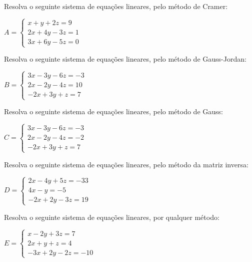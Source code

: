 \documentclass[pdftex, brazil, 12pt, oneside, addpoints]{exam}
\begin{document}
\begin{questions}
\question
Resolva o seguinte sistema de equações lineares, pelo método de Cramer:
\begin{center}$A = \begin{cases}
     x + y + 2z = 9\\
    2x + 4y - 3z = 1\\
    3x + 6y - 5z = 0 
  \end{cases}$
\end{center}

\question
Resolva o seguinte sistema de equações lineares, pelo método de Gauss-Jordan:
\begin{center}$B = \begin{cases}
  3x - 3y - 6z =  -3\\
  2x - 2y - 4z = 10\\
  -2x + 3y + z = 7
\end{cases}$
\end{center}

\question
Resolva o seguinte sistema de equações lineares, pelo método de Gauss:
\begin{center}$C = \begin{cases}
    3x - 3y - 6z = -3\\
    2x - 2y - 4z = -2\\
    -2x + 3y + z = 7
  \end{cases}$
\end{center}

\question
Resolva o seguinte sistema de equações lineares, pelo método da matriz inversa:
\begin{center}$D = \begin{cases}
    2x - 4y + 5z = -33\\
    4x - y = -5\\
    -2x + 2y - 3z = 19
  \end{cases}$
\end{center}

\question
Resolva o seguinte sistema de equações lineares, por qualquer método:
\begin{center}$E = \begin{cases}
    x - 2y + 3z = 7\\
    2x + y + z = 4\\
    -3x + 2y - 2z = -10
  \end{cases}$
\end{center}






\end{questions}
\end{document}
